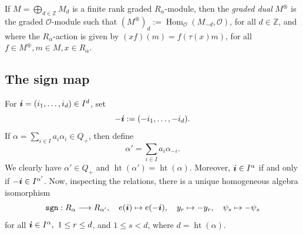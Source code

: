 \documentclass[twoside,11pt,reqno]{amsart}
\numberwithin{equation}{section}
\theoremstyle{definition}  %
\def\bi{\text{\boldmath$i$}}
\newcommand{\Hom}{\operatorname{Hom}}
\def\sgn{\mathtt{sgn}}
\newcommand{\Z}{\mathbb{Z}}
\newcommand{\0}{{\bar 0}}
\newcommand{\1}{{\bar 1}}
\newcommand{\al}{\alpha}
\def\height{{\operatorname{ht}}}
\renewcommand\O{\mathcal O}
\begin{document}
If $M=\bigoplus_{d\in\Z}M_d$ is a finite rank graded $R_\al$-module, then the {\em graded dual}
$M^\circledast$ is the graded $\O$-module such that $(M^\circledast)_d:=\Hom_\O(M_{-d},\O)$, for all
$d\in\Z$, and where the $R_\al$-action is given by $(xf)(m)=f(\tau(x)m)$, for all $f\in M^\circledast, m\in M, x\in
R_\al$. 



\subsection{The sign map}\label{SSSign}
For $\bi=(i_1,\dots,i_d)\in I^d$, 
set 
\begin{equation}
\label{E-I}
-\bi:=(-i_1,\dots,-i_d).
\end{equation} 
If %
$\al=\sum_{i\in I}a_i\alpha_i\in Q_+$, then define
$$\alpha'=\sum_{i\in I}a_i\alpha_{-i}.$$ 
We clearly have $\al'\in Q_+$ and $\height(\al')=\height(\al)$. Moreover, $\bi\in I^\al$ if and only if $-\bi\in I^{\al'}$. 
Now, inspecting the relations, there is a
unique homogeneous algebra isomorphism 
\begin{equation}\label{epsilon}
\sgn:{R_\al}\longrightarrow{R_{\al'}},\quad e(\bi)\mapsto e(-\bi), \quad
  y_r\mapsto -y_r,\quad
  \psi_s\mapsto-\psi_s
\end{equation}
for all $\bi\in I^\al,\ 1\leq r\leq d$, and $1\leq s<d$, where $d=\height(\al)$. 
\end{document}
